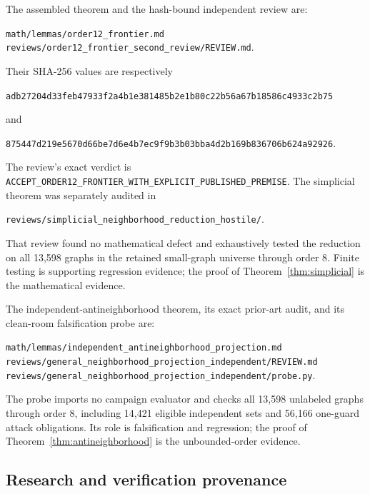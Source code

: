 \documentclass[11pt]{article}
\theoremstyle{definition}
\theoremstyle{remark}
\newcommand{\filehash}[1]{\nolinkurl{#1}}
\begin{document}
The assembled theorem and the hash-bound independent review are:
\begin{center}
\begin{minipage}{0.95\linewidth}
\texttt{math/lemmas/order12\_frontier.md}\\
\texttt{reviews/order12\_frontier\_second\_review/REVIEW.md}.
\end{minipage}
\end{center}
Their SHA-256 values are respectively
\begin{center}
\filehash{adb27204d33feb47933f2a4b1e381485b2e1b80c22b56a67b18586c4933c2b75}
\end{center}
and
\begin{center}
\filehash{875447d219e5670d66be7d6e4b7ec9f9b3b03bba4d2b169b836706b624a92926}.
\end{center}
The review's exact verdict is
\texttt{ACCEPT\_ORDER12\_FRONTIER\_WITH\_EXPLICIT\_PUBLISHED\_PREMISE}.
The simplicial theorem was separately audited in
\begin{center}
\texttt{reviews/simplicial\_neighborhood\_reduction\_hostile/}.
\end{center}
That review found no mathematical defect and exhaustively tested the
reduction on all 13,598 graphs in the retained small-graph universe through
order 8.  Finite testing is supporting regression evidence; the proof of
Theorem~\ref{thm:simplicial} is the mathematical evidence.

The independent-antineighborhood theorem, its exact prior-art audit, and
its clean-room falsification probe are:
\begin{center}
\begin{minipage}{0.95\linewidth}
\texttt{math/lemmas/independent\_antineighborhood\_projection.md}\\
\texttt{reviews/general\_neighborhood\_projection\_independent/REVIEW.md}\\
\texttt{reviews/general\_neighborhood\_projection\_independent/probe.py}.
\end{minipage}
\end{center}
The probe imports no campaign evaluator and checks all 13,598 unlabeled
graphs through order 8, including 14,421 eligible independent sets and
56,166 one-guard attack obligations.  Its role is falsification and
regression; the proof of Theorem~\ref{thm:antineighborhood} is the
unbounded-order evidence.

\subsection{Research and verification provenance}
\end{document}

